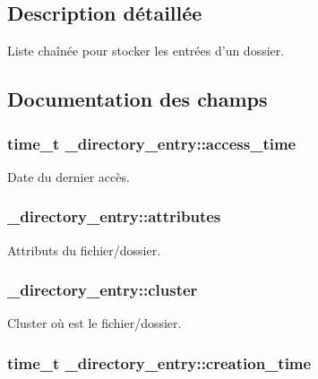 \subsection{Description détaillée}
Liste chaînée pour stocker les entrées d'un dossier. 

\subsection{Documentation des champs}
\hypertarget{struct__directory__entry_a27e1020c5262094ab3b58759da9660ae}{
\subsubsection[{access\-\_\-time}]{\setlength{\rightskip}{0pt plus 5cm}time\-\_\-t \-\_\-directory\-\_\-entry\-::access\-\_\-time}}\label{struct__directory__entry_a27e1020c5262094ab3b58759da9660ae}
Date du dernier accès. \hypertarget{struct__directory__entry_a63da8f87e73a3eb30e55b2d405fa35d7}{
\subsubsection[{attributes}]{ \-\_\-directory\-\_\-entry\-::attributes}}\label{struct__directory__entry_a63da8f87e73a3eb30e55b2d405fa35d7}
Attributs du fichier/dossier. \hypertarget{struct__directory__entry_a8c70d9d0c2b2557cba83fb827d5c6e90}{
\subsubsection[{cluster}]{ \-\_\-directory\-\_\-entry\-::cluster}}\label{struct__directory__entry_a8c70d9d0c2b2557cba83fb827d5c6e90}
Cluster où est le fichier/dossier. \hypertarget{struct__directory__entry_a95f0f5ef18bf17f332bd0dc352d62ac4}{
\subsubsection[{creation\-\_\-time}]{\setlength{\rightskip}{0pt plus 5cm}time\-\_\-t \-\_\-directory\-\_\-entry\-::creation\-\_\-time}}\label{struct__directory__entry_a95f0f5ef18bf17f332bd0dc352d62ac4}
